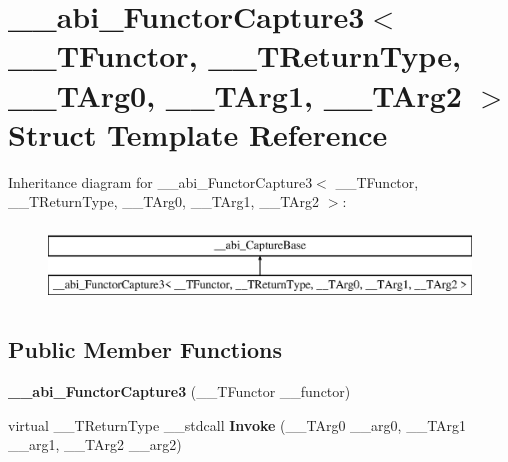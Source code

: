 \hypertarget{struct____abi___functor_capture3}{}\section{\+\_\+\+\_\+abi\+\_\+\+Functor\+Capture3$<$ \+\_\+\+\_\+\+T\+Functor, \+\_\+\+\_\+\+T\+Return\+Type, \+\_\+\+\_\+\+T\+Arg0, \+\_\+\+\_\+\+T\+Arg1, \+\_\+\+\_\+\+T\+Arg2 $>$ Struct Template Reference}
\label{struct____abi___functor_capture3}
Inheritance diagram for \+\_\+\+\_\+abi\+\_\+\+Functor\+Capture3$<$ \+\_\+\+\_\+\+T\+Functor, \+\_\+\+\_\+\+T\+Return\+Type, \+\_\+\+\_\+\+T\+Arg0, \+\_\+\+\_\+\+T\+Arg1, \+\_\+\+\_\+\+T\+Arg2 $>$\+:\begin{figure}[H]
\begin{center}
\leavevmode
\includegraphics[height=2.000000cm]{da/d48/struct____abi___functor_capture3}
\end{center}
\end{figure}
\subsection*{Public Member Functions}
\begin{DoxyCompactItemize}
\item 
\mbox{\label{struct____abi___functor_capture3_a1585cddf112fac2a7875fd37a40a0999}} 
{\bfseries \+\_\+\+\_\+abi\+\_\+\+Functor\+Capture3} (\+\_\+\+\_\+\+T\+Functor \+\_\+\+\_\+functor)
\item 
\mbox{\label{struct____abi___functor_capture3_ab232fcd31eac93e5bad4c740676066ab}} 
virtual \+\_\+\+\_\+\+T\+Return\+Type \+\_\+\+\_\+stdcall {\bfseries Invoke} (\+\_\+\+\_\+\+T\+Arg0 \+\_\+\+\_\+arg0, \+\_\+\+\_\+\+T\+Arg1 \+\_\+\+\_\+arg1, \+\_\+\+\_\+\+T\+Arg2 \+\_\+\+\_\+arg2)
\end{DoxyCompactItemize}
